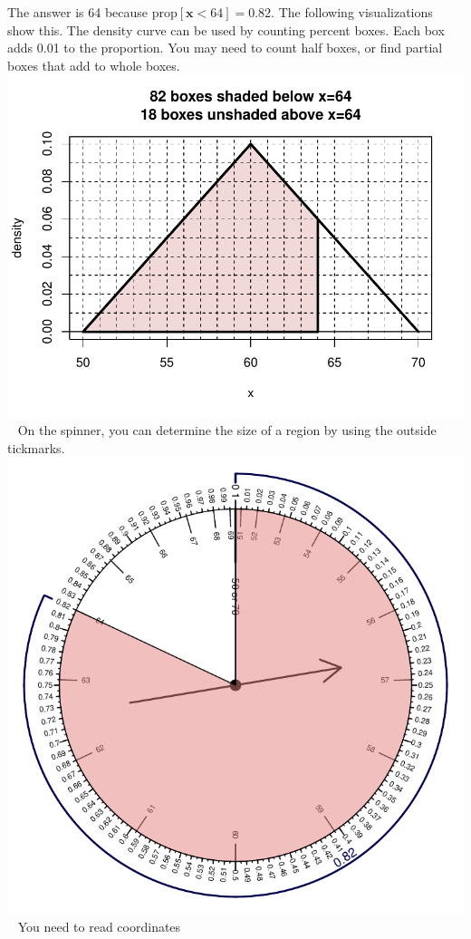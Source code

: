 \begin{solution}
\begin{answerlist}
  \item The answer is 64 because \(\text{prop}[\mathbf{x}<64]=0.82\). The
following visualizations show this. The density curve can be used by
counting percent boxes. Each box adds 0.01 to the proportion. You may
need to count half boxes, or find partial boxes that add to whole boxes.
\includegraphics{unnamed-chunk-14-1.pdf} ~ On the spinner, you can
determine the size of a region by using the outside tickmarks.
\includegraphics{unnamed-chunk-15-1.pdf} ~ You need to read coordinates

\end{answerlist}
\end{solution}
